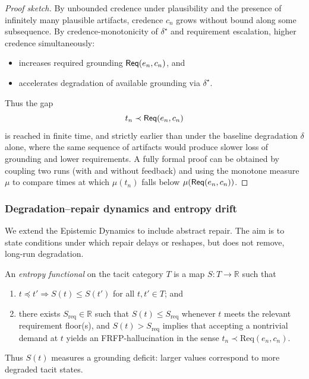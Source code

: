 \begin{proof}[Proof sketch]
By unbounded credence under plausibility and the presence of infinitely
many plausible artifacts, credence \(c_n\) grows without bound along
some subsequence. By credence-monotonicity of \(\delta^\star\) and
requirement escalation, higher credence simultaneously:
\begin{itemize}
  \item increases required grounding \(\mathsf{Req}(e_n,c_n)\), and
  \item accelerates degradation of available grounding via
        \(\delta^\star\).
\end{itemize}
Thus the gap
\[
t_n \prec \mathsf{Req}(e_n,c_n)
\]
is reached in finite time, and strictly earlier than under the baseline
degradation \(\delta\) alone, where the same sequence of artifacts
would produce slower loss of grounding and lower requirements.
A fully formal proof can be obtained by coupling two runs (with and
without feedback) and using the monotone measure \(\mu\) to compare
times at which \(\mu(t_n)\) falls below \(\mu(\mathsf{Req}(e_n,c_n))\).
\end{proof}


\subsubsection{Degradation--repair dynamics and entropy drift}
\label{app:delta-rho}
We extend the Epistemic Dynamics to include abstract repair. The aim is to state conditions under
which repair delays or reshapes, but does not remove, long-run degradation.

\begin{definition}
An \emph{entropy functional} on the tacit category $T$ is a map $S : T \to \mathbb{R}$ such that
\begin{enumerate}
  \item $t \preceq t' \Rightarrow S(t) \le S(t')$ for all $t,t' \in T$; and
  \item there exists $S_{\mathrm{req}} \in \mathbb{R}$ such that $S(t) \le S_{\mathrm{req}}$ whenever $t$
  meets the relevant requirement floor(s), and $S(t) > S_{\mathrm{req}}$ implies that accepting a
  nontrivial demand at $t$ yields an FRFP-hallucination in the sense $t_n \prec \mathrm{Req}(e_n,c_n)$.
\end{enumerate}
Thus $S(t)$ measures a grounding deficit: larger values correspond to more degraded tacit states.
\end{definition}

